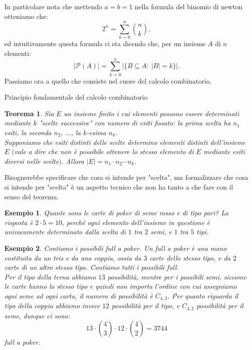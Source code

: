 \documentclass[11pt]{book}
\theoremstyle{Definizione}
\theoremstyle{TeoremaProposizioneLemmaCorollario}
\newtheorem{myteo}{Teorema}[section]
\theoremstyle{OsservazioneNota}
\newtheorem{myes}{Esempio}[section]
\newcommand{\parti}[1]{\mathcal{P}\left({#1}\right)}
\begin{document}
In particolare nota che mettendo $a = b = 1$ nella formula del binomio di newton otteniamo che:
$$
2^n = \sum_{k = 0}^n \binom{n}{k},
$$
ed intuitivamente questa formula ci sta dicendo che, per un insieme $A$ di $n$ elementi:
$$
|\parti{A}| = \sum_{k = 0}^n |\{B\subseteq A:\ |B| = k\}|.
$$
Passiamo ora a quello che consiste nel cuore del calcolo combinatorio.
\begin{boxteo}{Principio fondamentale del calcolo combinatorio}
\begin{myteo}
Sia $E$ un insieme finito i cui elementi possono essere determinati mediante $k$ "scelte successive" con numero di esiti fissato: la prima scelta ha $n_1$ esiti, la seconda $n_2$, $\dots$, la $k$-esima $n_k$.\\
Supponiamo che esiti distinti delle scelte determino elementi distinti dell'insieme $E$ $($vale a dire che non è possibile ottenere lo stesso elemento di $E$ mediante esiti diversi nelle scelte$)$. Allora $|E| = n_1 \cdot n_2 \cdots n_k$.
\end{myteo}
\end{boxteo}
\noindent
Bisognerebbe specificare che cosa si intende per "scelta", ma formalizzare che cosa si intende per "scelta" è un aspetto tecnico che non ha tanto a che fare con il senso del teorema.
\begin{myes}
Quante sono le carte di poker di seme rosso e di tipo pari? La risposta è $2\cdot 5 = 10$, perché ogni elemento dell'insieme in questione è univocamente determinato dalla scelta di $1$ tra $2$ semi, e $1$ tra $5$ tipi.
\end{myes}
\begin{myes}
Contiamo i possibili \textsl{full} a poker. Un \textsl{full} a poker è una mano costituita da un tris e da una coppia, ossia da $3$ carte dello stesso tipo, e da $2$ carte di un altro stesso tipo. Contiamo tutti i possibili \textsl{full}.\\
Per il tipo della terna abbiamo $13$ possibilità, mentre per i possibili semi, siccome le carte hanno lo stesso tipo e quindi non importa l'ordine con cui assegniamo ogni seme ad ogni carta, il numero di possibilità è $C_{4,3}$. Per quanto riguarda il tipo della coppia abbiamo invece $12$ possibilità per il tipo, e $C_{4,2}$ possibilità per il seme, dunque ci sono:
$$
13\cdot \binom{4}{3} \cdot 12 \cdot \binom{4}{2} = 3744
$$
\textsl{full} a poker.
\end{myes}
\end{document}
